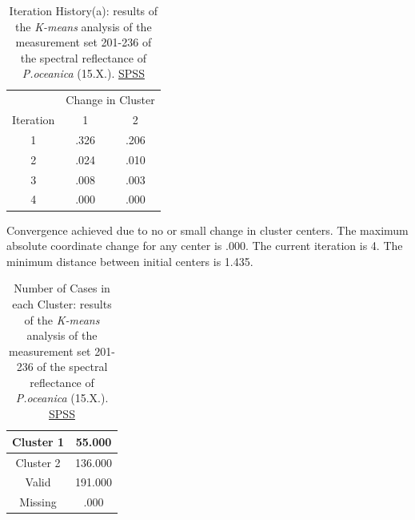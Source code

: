 \documentclass[11pt]{article}
\begin{document}
\begin{appendices}
\begin{table}[htbp]
	\caption{Iteration History(a): results of the \textit{K-means} analysis of the measurement set 201-236 of the spectral reflectance of \textit{P.oceanica} (15.X.).  \href{http://www.spss.com/}{SPSS}}
	\begin{center}
	\begin{tabular}{|c|c|c|}
		\hline\hline
		& \multicolumn{2}{|c|}{Change in Cluster} \\
		 Iteration & 1 & 2 \\ \hline\hline
		1 &	.326 &	.206 \\ \hline
		2 &	.024 & 	.010 \\ \hline
		3 &	.008 &	.003 \\ \hline
		4 &	.000 &	.000 \\ \hline
	\end{tabular}
	\end{center}
	Convergence achieved due to no or small change in cluster centers. The maximum absolute coordinate change for any center is .000. The current iteration is 4. The minimum distance between initial centers is 1.435.
\label{tab:21}
\end{table}

\begin{table}[H]
	\caption{Number of Cases in each Cluster: results of the \textit{K-means} analysis of the measurement set 201-236 of the spectral reflectance of \textit{P.oceanica} (15.X.).  \href{http://www.spss.com/}{SPSS}}
		\begin{center}
		\begin{tabular}{|c|c|}
		\hline\hline
			Cluster 1 & 55.000 \\ \hline
			Cluster 2 & 136.000 \\ \hline
			Valid &	191.000 \\ \hline
			Missing & .000 \\ \hline
		\end{tabular}
		\end{center}
	\label{tab:22}
\end{table}
\pagebreak


\end{appendices}
\end{document}
